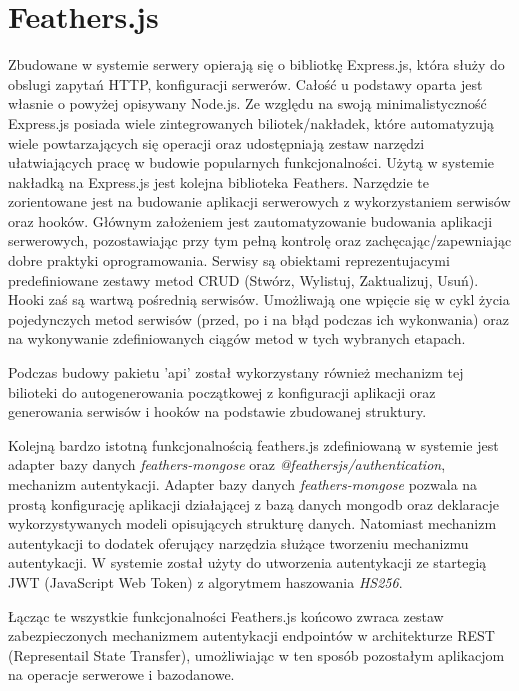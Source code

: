 \section{Feathers.js}
Zbudowane w systemie serwery opierają się o bibliotkę Express.js, która służy do obslugi zapytań HTTP, konfiguracji serwerów. Całość u podstawy oparta jest własnie o powyżej opisywany Node.js. Ze względu na swoją minimalistyczność Express.js posiada wiele zintegrowanych biliotek/nakładek, które automatyzują wiele powtarzających się operacji oraz udostępniają zestaw narzędzi ułatwiających pracę w budowie popularnych funkcjonalności. Użytą w systemie nakładką na Express.js jest kolejna biblioteka Feathers. Narzędzie te zorientowane jest na budowanie aplikacji serwerowych z wykorzystaniem serwisów oraz hooków. Głównym założeniem jest zautomatyzowanie budowania aplikacji serwerowych, pozostawiając przy tym pełną kontrolę oraz zachęcając/zapewniając dobre praktyki oprogramowania. Serwisy są obiektami reprezentujacymi predefiniowane zestawy metod CRUD (Stwórz, Wylistuj, Zaktualizuj, Usuń). Hooki zaś są wartwą pośrednią serwisów. Umożliwają one wpięcie się w cykl życia pojedynczych metod serwisów (przed, po i na błąd podczas ich wykonwania) oraz na wykonywanie zdefiniowanych ciągów metod w tych wybranych etapach. \cite{FeathersDocs}

Podczas budowy pakietu 'api' został wykorzystany również mechanizm tej bilioteki do autogenerowania początkowej z  konfiguracji aplikacji oraz generowania serwisów i hooków na podstawie zbudowanej struktury.

Kolejną bardzo istotną funkcjonalnością feathers.js zdefiniowaną w systemie jest adapter bazy danych \textit{feathers-mongose} oraz \textit{@feathersjs/authentication}, mechanizm autentykacji. Adapter bazy danych \textit{feathers-mongose} pozwala na prostą konfigurację aplikacji działającej z bazą danych mongodb oraz deklaracje wykorzystywanych modeli opisujących strukturę danych. Natomiast mechanizm autentykacji to dodatek oferujący narzędzia służące tworzeniu mechanizmu autentykacji. W systemie został użyty do utworzenia autentykacji ze startegią JWT (JavaScript Web Token) z algorytmem haszowania \textit{HS256}. 

Łącząc te wszystkie funkcjonalności Feathers.js końcowo zwraca zestaw zabezpieczonych mechanizmem autentykacji endpointów w architekturze REST (Representail State Transfer), umożliwiając w ten sposób pozostałym aplikacjom na operacje serwerowe i bazodanowe.

